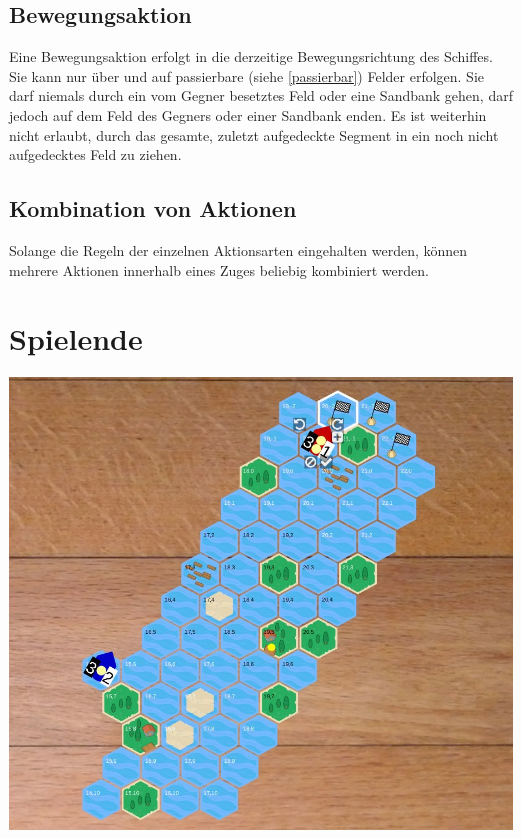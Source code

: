 \documentclass[12pt,a4paper, ngerman, oneside]{scrartcl}
\begin{document}
\subsection{\label{step}Bewegungsaktion}

Eine Bewegungsaktion erfolgt in die derzeitige Bewegungsrichtung des Schiffes.
Sie kann nur über und auf passierbare (siehe \ref{passierbar}) Felder erfolgen.
Sie darf niemals durch ein vom Gegner besetztes Feld oder eine Sandbank gehen,
darf jedoch auf dem Feld des Gegners oder einer Sandbank enden. Es ist weiterhin
nicht erlaubt, durch das gesamte, zuletzt aufgedeckte Segment in ein noch nicht
aufgedecktes Feld zu ziehen.

\subsection{Kombination von Aktionen}

Solange die Regeln der einzelnen Aktionsarten eingehalten werden, können mehrere
Aktionen innerhalb eines Zuges beliebig kombiniert werden.

\section{Spielende}\label{sec:spielende}

\begin{centering}
  \includegraphics[width=\textwidth]{bilder/spielfeld-ziel.jpg}
\end{centering}
\end{document}
